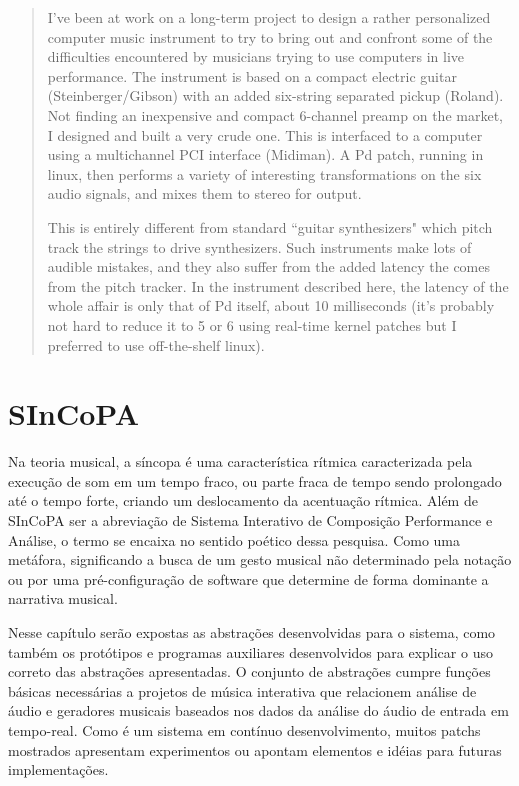 \documentclass{ppgmus}
\begin{document}
\begin{quote}
 I've been at work on a long-term project to design a rather personalized computer music instrument to try 
to bring out and confront some of the difficulties encountered by musicians trying to use computers in live 
performance. The instrument is based on a compact electric guitar (Steinberger/Gibson) with an added six-string 
separated pickup (Roland). Not finding an inexpensive and compact 6-channel preamp on the market, I designed and 
built a very crude one. This is interfaced to a computer using a multichannel PCI interface (Midiman). 
A Pd patch, running in linux, then performs a variety of interesting transformations on the six audio signals, 
and mixes them to stereo for output.

This is entirely different from standard ``guitar synthesizers" which pitch track the strings to drive synthesizers. 
Such instruments make lots of audible mistakes, and they also suffer from the added latency the comes from the pitch 
tracker. In the instrument described here, the latency of the whole affair is only that of Pd itself, about 10 
milliseconds (it's probably not hard to reduce it to 5 or 6 using real-time kernel patches but I preferred to use 
off-the-shelf linux). 
\end{quote}



\chapter{SInCoPA}
\label{chap:SInCoPA}


Na teoria musical, a síncopa é uma característica rítmica caracterizada pela execução de som em um tempo fraco, 
ou parte fraca de tempo sendo prolongado até o tempo forte, criando um deslocamento da acentuação rítmica. 
Além de SInCoPA ser a abreviação de Sistema Interativo de Composição Performance e Análise, o termo se encaixa
no sentido poético dessa pesquisa. Como uma metáfora, significando a busca de um gesto musical não determinado pela notação
ou por uma pré-configuração de software que determine de forma dominante a narrativa musical.

  Nesse capítulo serão expostas as abstrações desenvolvidas para o sistema, como também
os protótipos e programas auxiliares desenvolvidos para explicar o uso correto das 
abstrações apresentadas. O conjunto de abstrações cumpre funções básicas necessárias
a projetos de música interativa que relacionem análise de áudio e geradores musicais
baseados nos dados da análise do áudio de entrada em tempo-real. Como é um sistema 
em contínuo desenvolvimento, muitos patchs mostrados apresentam experimentos ou apontam
elementos e idéias para futuras implementações.
\end{document}
